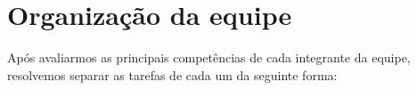 \section{Organização da equipe}
Após avaliarmos as principais competências de cada integrante da equipe, resolvemos separar as tarefas de cada um da seguinte forma:


